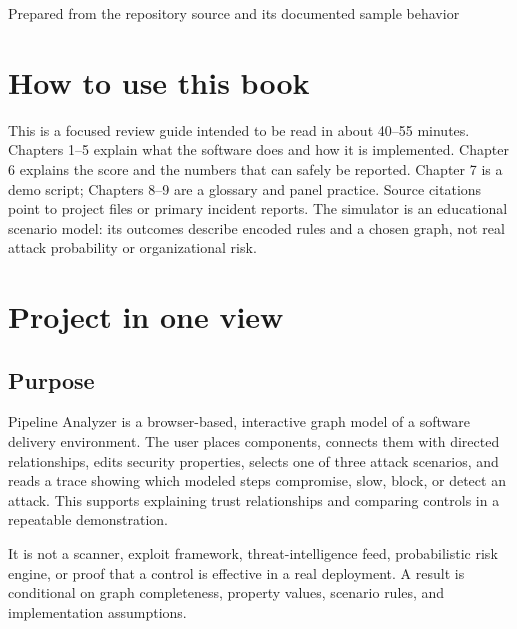 \documentclass[11pt,oneside]{book}
\begin{document}
\frontmatter
\begin{titlepage}\centering\vspace*{1.5in}{\Huge\bfseries Pipeline Analyzer\par}\vspace{0.25in}{\LARGE Project Review Book\par}\vspace{0.55in}{\large Architecture, implementation, attack models, results, and panel preparation\par}\vfill{\large Prepared from the repository source and its documented sample behavior\par}\vspace{0.2in}{\large October 2026\par}\end{titlepage}
\chapter*{How to use this book}
This is a focused review guide intended to be read in about 40--55 minutes. Chapters 1--5 explain what the software does and how it is implemented. Chapter 6 explains the score and the numbers that can safely be reported. Chapter 7 is a demo script; Chapters 8--9 are a glossary and panel practice. Source citations point to project files or primary incident reports. The simulator is an educational scenario model: its outcomes describe encoded rules and a chosen graph, not real attack probability or organizational risk.
\tableofcontents
\mainmatter

\chapter{Project in one view}
\section{Purpose}
Pipeline Analyzer is a browser-based, interactive graph model of a software delivery environment. The user places components, connects them with directed relationships, edits security properties, selects one of three attack scenarios, and reads a trace showing which modeled steps compromise, slow, block, or detect an attack. This supports explaining trust relationships and comparing controls in a repeatable demonstration.

It is not a scanner, exploit framework, threat-intelligence feed, probabilistic risk engine, or proof that a control is effective in a real deployment. A result is conditional on graph completeness, property values, scenario rules, and implementation assumptions.
\end{document}
